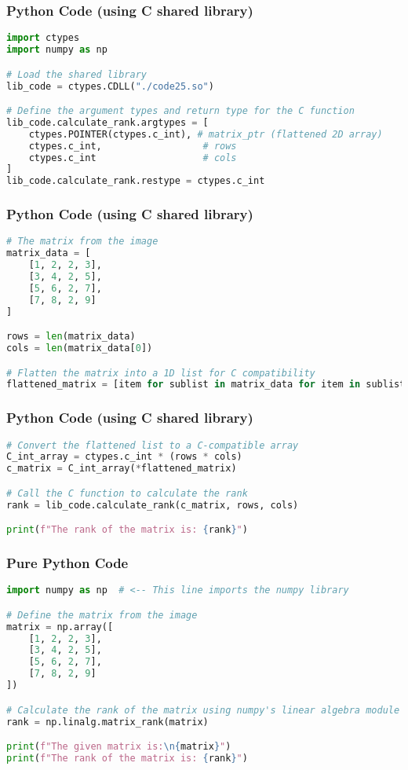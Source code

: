 \documentclass{beamer}
\begin{document}
\begin{frame}[fragile]
\frametitle{Python Code (using C shared library)}
\begin{lstlisting}[language=Python]
import ctypes
import numpy as np

# Load the shared library
lib_code = ctypes.CDLL("./code25.so")

# Define the argument types and return type for the C function
lib_code.calculate_rank.argtypes = [
    ctypes.POINTER(ctypes.c_int), # matrix_ptr (flattened 2D array)
    ctypes.c_int,                  # rows
    ctypes.c_int                   # cols
]
lib_code.calculate_rank.restype = ctypes.c_int
\end{lstlisting}
\end{frame}

\begin{frame}[fragile]
\frametitle{Python Code (using C shared library)}
\begin{lstlisting}[language=Python]
# The matrix from the image
matrix_data = [
    [1, 2, 2, 3],
    [3, 4, 2, 5],
    [5, 6, 2, 7],
    [7, 8, 2, 9]
]

rows = len(matrix_data)
cols = len(matrix_data[0])

# Flatten the matrix into a 1D list for C compatibility
flattened_matrix = [item for sublist in matrix_data for item in sublist]
\end{lstlisting}
\end{frame}

\begin{frame}[fragile]
\frametitle{Python Code (using C shared library)}
\begin{lstlisting}[language=Python]
# Convert the flattened list to a C-compatible array
C_int_array = ctypes.c_int * (rows * cols)
c_matrix = C_int_array(*flattened_matrix)

# Call the C function to calculate the rank
rank = lib_code.calculate_rank(c_matrix, rows, cols)

print(f"The rank of the matrix is: {rank}")
\end{lstlisting}
\end{frame}

\begin{frame}[fragile]
\frametitle{Pure Python Code}
\begin{lstlisting}[language=Python]
import numpy as np  # <-- This line imports the numpy library

# Define the matrix from the image
matrix = np.array([
    [1, 2, 2, 3],
    [3, 4, 2, 5],
    [5, 6, 2, 7],
    [7, 8, 2, 9]
])

# Calculate the rank of the matrix using numpy's linear algebra module
rank = np.linalg.matrix_rank(matrix) 

print(f"The given matrix is:\n{matrix}")
print(f"The rank of the matrix is: {rank}")
\end{lstlisting}
\end{frame}
\end{document}
